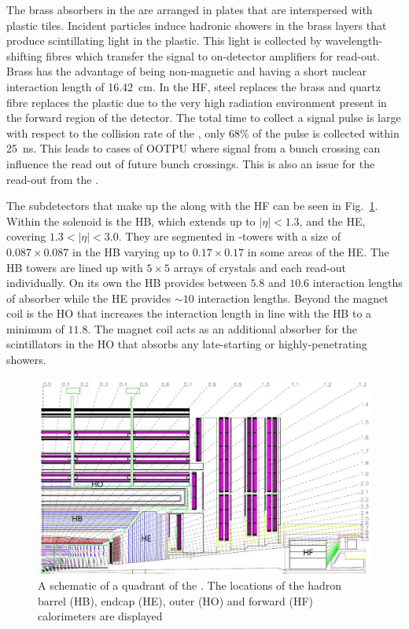 The brass absorbers in the \HCAL are arranged in plates that are interspersed with
plastic tiles. Incident particles induce hadronic showers in the
brass layers that produce scintillating light in the plastic. This
light is collected by wavelength-shifting fibres which transfer the
signal to on-detector amplifiers for read-out. Brass has the advantage
of being non-magnetic and having a short nuclear interaction length
of 16.42~cm. In the \ac{HF}, steel replaces the brass and quartz fibre
replaces the plastic due to the very high radiation environment
present in the forward region of the detector. The total time to
collect a \HCAL signal pulse is large with respect to the collision
rate of the \LHC, only $68\%$ of the pulse is collected within 25~ns.
This leads to cases of \ac{OOTPU} where signal from a bunch
crossing can influence the read out of future bunch crossings. This
is also an issue for the read-out from the \ECAL.

The subdetectors that make up the \HCAL along with the \ac{HF} can be
seen in Fig.~\ref{fig:hcal}. Within the solenoid is the \ac{HB},
which extends up to $|\eta|<1.3$, and the \ac{HE}, covering
$1.3<|\eta|<3.0$. They are segmented in \eta-\phi towers with a size
of $0.087\times0.087$ in the \ac{HB} varying up to $0.17\times0.17$ in
some areas of the \ac{HE}. The \ac{HB} towers are lined up with
$5\times5$ arrays of \ECAL crystals and each read-out individually. On
its own the \ac{HB} provides between $5.8$ and $10.6$ interaction
lengths of absorber while the \ac{HE} provides $\sim10$ interaction
lengths. Beyond the magnet coil is the \ac{HO} that increases the
interaction length in line with the \ac{HB} to a minimum of $11.8$.
The magnet coil acts as an additional absorber for the scintillators in the
\ac{HO} that absorbs any late-starting or highly-penetrating showers.

\begin{figure}
\begin{center}
\includegraphics[width=0.8\linewidth]{figs/cms_HCAL} \end{center}
\caption{ A schematic of a quadrant of the \CMS \HCAL. The locations of the hadron
barrel (HB), endcap (HE), outer (HO) and forward (HF) calorimeters are
displayed \cite{Chatrchyan:2008aa}}
\label{fig:hcal} \end{figure}


